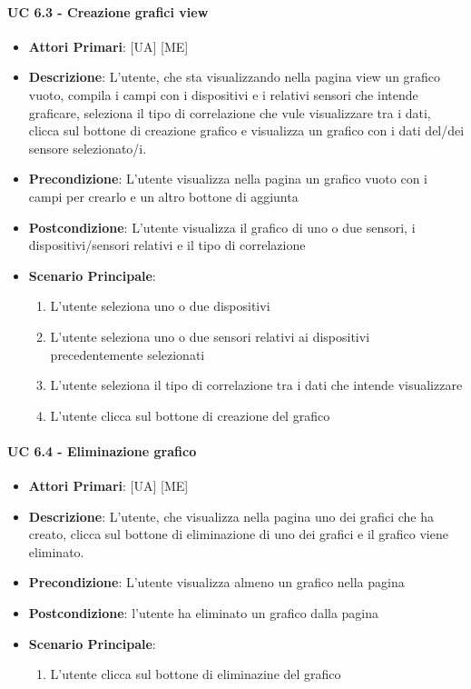 			\paragraph{UC 6.3 - Creazione grafici view}
			\begin{itemize}
				\item \textbf{Attori Primari}: [UA] [ME]
				\item \textbf{Descrizione}: L'utente, che sta visualizzando nella pagina view un grafico vuoto, compila i campi con i dispositivi e i relativi sensori che intende graficare, seleziona il tipo di correlazione che vule visualizzare tra i dati, clicca sul bottone di creazione grafico e visualizza un grafico con i dati del/dei sensore selezionato/i.
				\item \textbf{Precondizione}: L'utente visualizza nella pagina un grafico vuoto con i campi per crearlo e un altro bottone di aggiunta
				\item \textbf{Postcondizione}: L'utente visualizza il grafico di uno o due sensori, i dispositivi/sensori relativi e il tipo di correlazione 
				\item \textbf{Scenario Principale}:
				\begin{enumerate}
					\item{L'utente seleziona uno o due dispositivi}
					\item{L'utente seleziona uno o due sensori relativi ai dispositivi precedentemente selezionati}
					\item{L'utente seleziona il tipo di correlazione tra i dati che intende visualizzare}
					\item{L'utente clicca sul bottone di creazione del grafico}
				\end{enumerate}	
			\end{itemize}

			\paragraph{UC 6.4 - Eliminazione grafico}
			\begin{itemize}
				\item \textbf{Attori Primari}: [UA] [ME]
				\item \textbf{Descrizione}: L'utente, che visualizza nella pagina uno dei grafici che ha creato, clicca sul bottone di eliminazione di uno dei grafici e il grafico viene eliminato.
				\item \textbf{Precondizione}: L'utente visualizza almeno un grafico nella pagina
				\item \textbf{Postcondizione}: l'utente ha eliminato un grafico dalla pagina
				\item \textbf{Scenario Principale}:
				\begin{enumerate}
					\item{L'utente clicca sul bottone di eliminazine del grafico}
				\end{enumerate}	
			\end{itemize}

